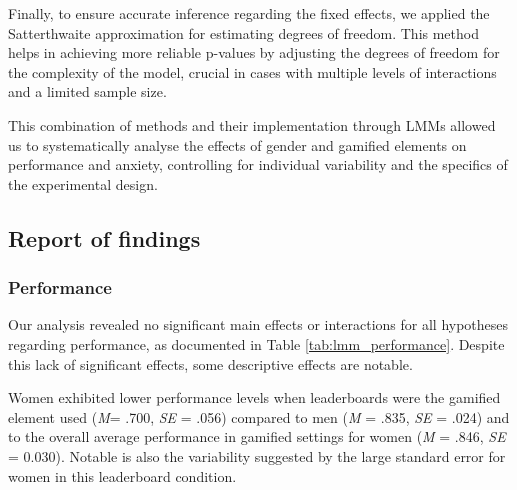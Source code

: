 Finally, to ensure accurate inference regarding the fixed effects, we applied the Satterthwaite approximation for estimating degrees of freedom.
This method helps in achieving more reliable p-values by adjusting the degrees of freedom for the complexity of the model, crucial in cases with multiple levels of interactions and a limited sample size.

This combination of methods and their implementation through LMMs allowed us to systematically analyse the effects of gender and gamified elements on performance and anxiety, controlling for individual variability and the specifics of the experimental design.

\subsection{Report of findings}

\subsubsection{Performance}
Our analysis revealed no significant main effects or interactions for all hypotheses regarding performance, as documented in Table \ref{tab:lmm_performance}.
Despite this lack of significant effects, some descriptive effects are notable.

Women exhibited lower performance levels when leaderboards were the gamified element used (\textit{M}= .700, \textit{SE} = .056) compared to men (\textit{M} = .835, \textit{SE} = .024) and to the overall average performance in gamified settings for women (\textit{M} = .846, \textit{SE} = 0.030).
Notable is also the variability suggested by the large standard error for women in this leaderboard condition.

